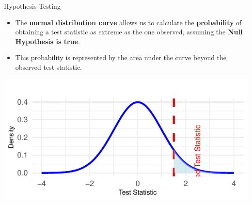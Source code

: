\documentclass[
  ignorenonframetext,
]{beamer}
\providecommand{\tightlist}{%
  \setlength{\itemsep}{0pt}\setlength{\parskip}{0pt}}
\begin{document}
\begin{frame}{Hypothesis Testing}
\label{hypothesis-testing-1}
\begin{itemize}
\tightlist
\item
  The \textbf{normal distribution curve} allows us to calculate the
  \textbf{probability} of obtaining a test statistic as extreme as the
  one observed, assuming the \textbf{Null Hypothesis is true}.
\end{itemize}

\begin{itemize}
\tightlist
\item
  This probability is represented by the area under the curve beyond the
  observed test statistic.
\end{itemize}

\includegraphics{M5-Hypothesis-Testing,-Probability-and-Distribution_files/figure-beamer/unnamed-chunk-8-1.pdf}
\end{frame}
\end{document}
